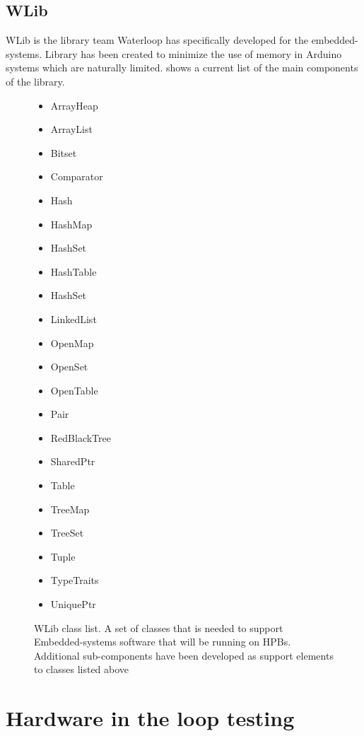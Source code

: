 \documentclass[main.tex]{subfiles}
\begin{document}
   \subsection{WLib}
   WLib is the library team Waterloop has specifically developed for the embedded-systems. Library has been created  to minimize the use of memory in Arduino systems which are naturally limited.  shows a current list of the main components of the library.
   \begin{figure}
   \begin{multicols}{4}
        \begin{itemize}
            \item ArrayHeap
            \item ArrayList
            \item Bitset
            \item Comparator
            \item Hash
            \item HashMap
            \item HashSet
            \item HashTable
            \item HashSet
            \item LinkedList
            \item OpenMap
            \item OpenSet
            \item OpenTable
            \item Pair
            \item RedBlackTree
            \item SharedPtr
            \item Table
            \item TreeMap
            \item TreeSet
            \item Tuple
            \item TypeTraits
            \item UniquePtr
        \end{itemize}
        \end{multicols}
        \caption{WLib class list. A set of classes that is needed to support Embedded-systems software that will be running on HPBs. Additional sub-components have been developed as support elements to classes listed above}
	\label{list:wlib-classes}
\end{figure}
   
   \section{Hardware in the loop testing}
\end{document}
